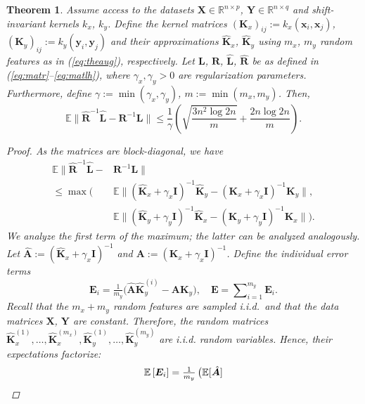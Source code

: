 \documentclass{article}
\newcommand{\nlsum}{\sum\nolimits}
\newtheorem{theorem}{Theorem}
\begin{document}
  \begin{theorem}\label{thm:cca}
    Assume access to the datasets $\bm X \in \mathbb{R}^{n \times p}$, $\bm Y
    \in \mathbb{R}^{n\times q}$ and shift-invariant kernels $k_x$, $k_y$.
    Define the kernel matrices $(\bm K_x)_{ij} := k_x(\bm x_i, \bm x_j)$,
    $(\bm K_y)_{ij} := k_y(\bm y_i, \bm y_j)$ and their approximations $\hat{\bm
    K}_x$, $\hat{\bm K}_y$ using $m_x$, $m_y$ random features as in
    (\ref{eq:theaug}), respectively.  Let $\bm L$, $\bm R$, $\hat{\bm L}$,
    $\hat{\bm R}$ be as defined in (\ref{eq:matr}--\ref{eq:matlh}), where
    $\gamma_x, \gamma_y > 0$ are regularization parameters.  Furthermore,
    define $\gamma := \min(\gamma_x,\gamma_y)$, $m := \min(m_x,m_y)$. Then,
    \begin{equation}\label{eq:ccaconc}
    \mathbb{E}\| \hat{\bm R}^{-1} \hat{\bm L} - \bm R^{-1}\bm L\| \leq
    \frac{1}{\gamma}\left(\sqrt{\frac{3n^2\log2n}{m}}+\frac{2n\log 2n}{m}
    \right ).
    \end{equation}
    \begin{proof} As the matrices are block-diagonal, we have
    \begin{align*}
    \mathbb{E}\| \hat{\bm R}^{-1} \hat{\bm L} - &\bm R^{-1}\bm L\|\\
    \leq \max(&\mathbb{E}\|(\hat{\bm K}_x+\gamma_x \bm I)^{-1}\hat{\bm
    K}_y-(\bm K_x+\gamma_x \bm I)^{-1}\bm K_y\|,\\
    &\mathbb{E}\|(\hat{\bm K}_y+\gamma_y \bm I)^{-1}\hat{\bm K}_x-(\bm
    K_y+\gamma_y \bm I)^{-1}\bm K_x\|).
    \end{align*}
    We analyze the first term of the maximum; the latter can be analyzed
    analogously.  Let $\hat{\bm A} := (\hat{\bm K}_x+\gamma_x \bm I)^{-1}$ and
    $\bm A := (\bm K_x+\gamma_x \bm I)^{-1}$. Define the individual error terms
    \begin{equation*}
    \bm E_i = \tfrac{1}{m_y}\bigl(\hat{\bm A}\hat{\bm K}^{(i)}_y-\bm A\bm K_y
    \bigr), \quad \bm E = \nlsum_{i=1}^{m_y} \bm E_i.
    \end{equation*}
    Recall that the $m_x+m_y$ random features are sampled i.i.d.\ and that the
    data matrices $\bm X$, $\bm Y$ are constant.  Therefore, the random
    matrices $\bm \hat{\bm K}_x^{(1)}, \ldots, \bm \hat{\bm K}_x^{(m_x)},\bm
    \hat{\bm K}_y^{(1)}, \ldots, \bm \hat{\bm K}_y^{(m_y)}$ are i.i.d.
    random variables.  Hence, their expectations factorize:
    \begin{equation*}
    \mathbb{E}\,[\bm E_i] = \tfrac{1}{m_y}\,\bigl(\mathbb{E}[\hat{\bm A}]\bm

\end{equation*}
\end{proof}
\end{theorem}
\end{document}
